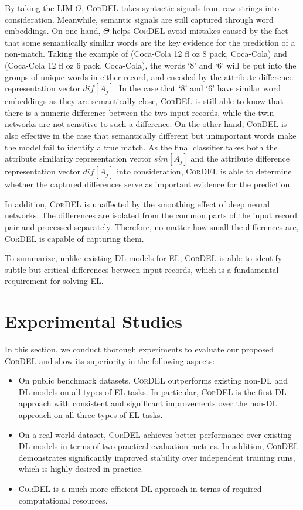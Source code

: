 \documentclass[conference]{IEEEtran}
\begin{document}
By taking the LIM $\Theta$, \textsc{CorDEL} takes syntactic signals from raw strings into consideration. Meanwhile, semantic signals are still captured through word embeddings. On one hand, $\Theta$ helps \textsc{CorDEL} avoid mistakes caused by the fact that some semantically similar words are the key evidence for the prediction of a non-match. Taking the example of (Coca-Cola 12 fl oz 8 pack, Coca-Cola) and (Coca-Cola 12 fl oz 6 pack, Coca-Cola), the words `8' and `6' will be put into the groups of unique words in either record, and encoded by the attribute difference representation vector $dif[A_j]$. In the case that `8' and `6' have similar word embeddings as they are semantically close, \textsc{CorDEL} is still able to know that there is a numeric difference between the two input records, while the twin networks are not sensitive to such a difference. On the other hand, \textsc{CorDEL} is also effective in the case that semantically different but unimportant words make the model fail to identify a true match. As the final classifier takes both the attribute similarity representation vector $sim[A_j]$ and the attribute difference representation vector $dif[A_j]$ into consideration, \textsc{CorDEL} is able to determine whether the captured differences serve as important evidence for the prediction.

In addition, \textsc{CorDEL} is unaffected by the smoothing effect of deep neural networks. The differences are isolated from the common parts of the input record pair and processed separately. Therefore, no matter how small the differences are, \textsc{CorDEL} is capable of capturing them.

To summarize, unlike existing DL models for EL, \textsc{CorDEL} is able to identify subtle but critical differences between input records, which is a fundamental requirement for solving EL.

\section{Experimental Studies}\label{sec:experiments}

In this section, we conduct thorough experiments to evaluate our proposed \textsc{CorDEL} and show its superiority in the following aspects:
\begin{itemize}
    \item On public benchmark datasets, \textsc{CorDEL} outperforms existing non-DL and DL models on all types of EL tasks. In particular, \textsc{CorDEL} is the first DL approach with consistent and significant improvements over the non-DL approach on all three types of EL tasks.
    
    \item On a real-world dataset, \textsc{CorDEL} achieves better performance over existing DL models in terms of two practical evaluation metrics. In addition, \textsc{CorDEL} demonstrates significantly improved stability over independent training runs, which is highly desired in practice.
    
    \item \textsc{CorDEL} is a much more efficient DL approach in terms of required computational resources.
\end{itemize}
\end{document}
